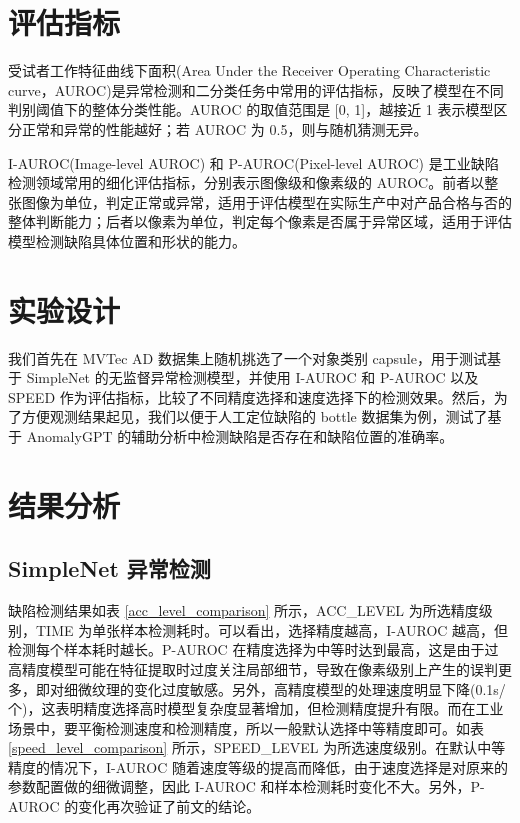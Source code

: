 \documentclass[
  ]{njuthesis}
\begin{document}
\section{评估指标}

受试者工作特征曲线下面积(Area Under the Receiver Operating Characteristic curve，AUROC)是异常检测和二分类任务中常用的评估指标，反映了模型在不同判别阈值下的整体分类性能。AUROC 的取值范围是 [0, 1]，越接近 1 表示模型区分正常和异常的性能越好；若 AUROC 为 0.5，则与随机猜测无异。

I-AUROC(Image-level AUROC) 和 P-AUROC(Pixel-level AUROC) 是工业缺陷检测领域常用的细化评估指标，分别表示图像级和像素级的 AUROC。前者以整张图像为单位，判定正常或异常，适用于评估模型在实际生产中对产品合格与否的整体判断能力；后者以像素为单位，判定每个像素是否属于异常区域，适用于评估模型检测缺陷具体位置和形状的能力。

\section{实验设计}

我们首先在 MVTec AD 数据集上随机挑选了一个对象类别 capsule，用于测试基于 SimpleNet 的无监督异常检测模型，并使用 I-AUROC 和 P-AUROC 以及 SPEED 作为评估指标，比较了不同精度选择和速度选择下的检测效果。然后，为了方便观测结果起见，我们以便于人工定位缺陷的 bottle 数据集为例，测试了基于 AnomalyGPT 的辅助分析中检测缺陷是否存在和缺陷位置的准确率。

\section{结果分析}

\subsection{SimpleNet 异常检测}

缺陷检测结果如表 \ref{acc_level_comparison} 所示，ACC\_LEVEL 为所选精度级别，TIME 为单张样本检测耗时。可以看出，选择精度越高，I-AUROC 越高，但检测每个样本耗时越长。P-AUROC 在精度选择为中等时达到最高，这是由于过高精度模型可能在特征提取时过度关注局部细节，导致在像素级别上产生的误判更多，即对细微纹理的变化过度敏感。另外，高精度模型的处理速度明显下降(0.1s/个)，这表明精度选择高时模型复杂度显著增加，但检测精度提升有限。而在工业场景中，要平衡检测速度和检测精度，所以一般默认选择中等精度即可。如表 \ref{speed_level_comparison} 所示，SPEED\_LEVEL 为所选速度级别。在默认中等精度的情况下，I-AUROC 随着速度等级的提高而降低，由于速度选择是对原来的参数配置做的细微调整，因此 I-AUROC 和样本检测耗时变化不大。另外，P-AUROC 的变化再次验证了前文的结论。
\end{document}
